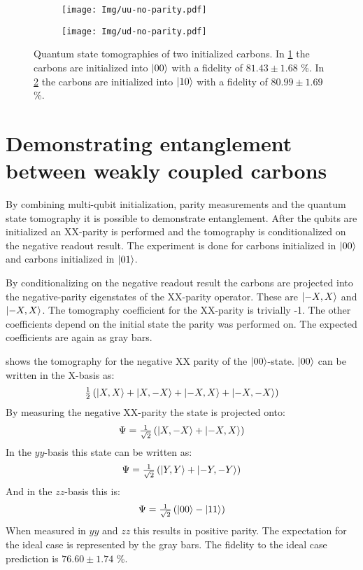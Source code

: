 \begin{figure}[htbp]
    \begin{subfigure}[t]{0.49\textwidth}\centering
        \caption{}
        \texttt{[image: Img/uu-no-parity.pdf]}
        \label{fig:uu-init }
    \end{subfigure}
    \begin{subfigure}[t]{0.49\textwidth}\centering
        \caption{}
        \texttt{[image: Img/ud-no-parity.pdf]}
        \label{fig:ud-init }
    \end{subfigure}
    \caption{ Quantum state tomographies of two initialized carbons. In \cref{fig:uu-init } the carbons are initialized into ${\left\vert{00}\right\rangle}$ with a fidelity of  $81.43 \pm 1.68$ \%.
    In \cref{fig:ud-init } the carbons are initialized into ${\left\vert{10}\right\rangle}$ with a fidelity of $80.99 \pm 1.69$ \%.
    }
    \label{fig:2qubitTomos}
\end{figure}

\section{Demonstrating entanglement between weakly coupled carbons}
By combining multi-qubit initialization, parity measurements and the quantum state tomography it is possible to demonstrate entanglement.
After the qubits are initialized an XX-parity is performed and the tomography is conditionalized on the negative readout result.
The experiment is done for carbons initialized in ${\left\vert{00}\right\rangle}$ and carbons initialized in ${\left\vert{01}\right\rangle}$.

By conditionalizing on the negative readout result the carbons are projected into the negative-parity eigenstates of the XX-parity operator.
These are ${\left\vert{-X,X}\right\rangle}$ and ${\left\vert{-X,X}\right\rangle}$.
The tomography coefficient for the XX-parity is trivially -1.
The other coefficients depend on the initial state the parity was performed on.
The expected coefficients are again as gray bars.

 shows the tomography for the negative XX parity of the ${\left\vert{00}\right\rangle}$-state.
${\left\vert{00}\right\rangle}$ can be written in the X-basis as:
\begin{equation}
      \tfrac{1}{2} \left( {\left\vert{X,X}\right\rangle} + {\left\vert{X,-X}\right\rangle} +{\left\vert{-X,X}\right\rangle} + {\left\vert{-X,-X}\right\rangle} \right)
 \end{equation}
By measuring the negative XX-parity the state is projected onto:
\begin{equation}
    \Psi = \tfrac{1}{\sqrt{2}} \left( {\left\vert{X,-X}\right\rangle} +{\left\vert{-X,X}\right\rangle} \right)
\end{equation}
In the $yy$-basis this state can be written as:
\begin{equation}
    \Psi = \tfrac{1}{\sqrt{2}} \left( {\left\vert{Y,Y}\right\rangle} +{\left\vert{-Y,-Y}\right\rangle} \right)
\end{equation}
And in the $zz$-basis this is:
\begin{equation}
    \Psi = \tfrac{1}{\sqrt{2}} \left( {\left\vert{00}\right\rangle} -{\left\vert{11}\right\rangle} \right)
\end{equation}
When measured in $yy$ and $zz$ this results in positive parity.
The expectation for the ideal case is represented by the gray bars.
The fidelity to the ideal case prediction is $76.60 \pm 1.74$ \%.

